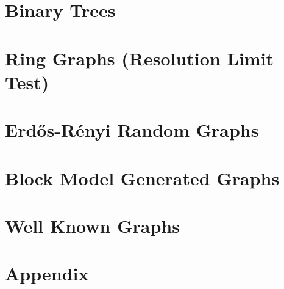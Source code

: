 \documentclass[twocolumn,twoside]{IEEEtran}
\begin{document}
%
% 
%
%
%   

\newcommand{\inputsamepage}[1] {
    \begin{minipage}{\linewidth}
        
    \end{minipage}
}


\break
\section*{Binary Trees}


\break
\section*{Ring Graphs (Resolution Limit Test)}


\break
\section*{Erd\H{o}s-R\'{e}nyi Random Graphs}


\section*{Block Model Generated Graphs}


\section*{Well Known Graphs}



\onecolumn
\section{Appendix}
 

\twocolumn
{}

\end{document}
